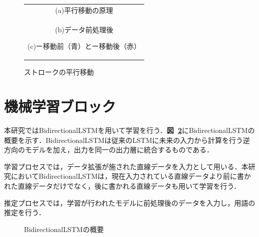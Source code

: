 \begin{figure}[tb]
 \centering
  \begin{tabular}{c}
   \begin{minipage}[b]{0.7\hsize}
    \centering
    (a)平行移動の原理
   \end{minipage}\\
    \hfill
   \begin{minipage}[b]{0.5\hsize}
    \centering
    (b)データ前処理後
   \end{minipage}
   \begin{minipage}[b]{0.5\hsize}
    \centering
    (c)ー移動前（青）とー移動後（赤）
   \end{minipage}
  \end{tabular}
 \caption{ストロークの平行移動}
 \label{yratio}
\end{figure}


\section{機械学習ブロック}
\label{sec:m_learning}
本研究ではBidirectionalLSTMを用いて学習を行う．\textbf{図~\ref{blstm}}にBidirectionalLSTMの概要を示す．BidirectionalLSTMは従来のLSTMに未来の入力から計算を行う逆方向のモデルを加え，出力を同一の出力層に統合するものである．

学習プロセスでは，データ拡張が施された直線データを入力として用いる．本研究においてBidirectionalLSTMは，現在入力されている直線データより前に書かれた直線データだけでなく，後に書かれる直線データも用いて学習を行う．

推定プロセスでは，学習が行われたモデルに前処理後のデータを入力し，用語の推定を行う．

\begin{figure}[tb]
 \begin{center}
  \caption{BidirectionalLSTMの概要}
  \label{blstm}
\end{center}
\end{figure}

